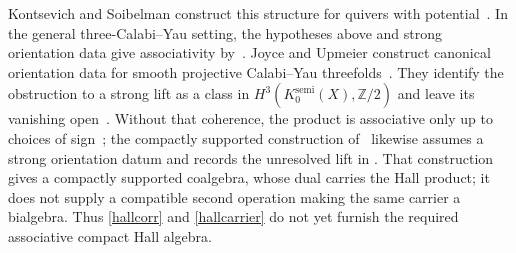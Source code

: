 \documentclass[11pt]{article}
\begin{document}
Kontsevich and Soibelman construct this structure for quivers with
potential~\cite[\S7]{KontsevichSoibelman2011}.  In the general
three-Calabi--Yau setting, the hypotheses above and strong orientation data
give associativity
by~\cite[Theorem A, Definition 8.4, Corollary 8.8]{KinjoParkSafronov2026}.
Joyce and Upmeier construct canonical orientation data for smooth
projective Calabi--Yau threefolds~\cite[Theorem 4.4]{JoyceUpmeier2021}.
They identify the obstruction to a strong lift as a class in
$H^3(K^{\mathrm{semi}}_0(X),\mathbb Z/2)$ and leave its vanishing
open~\cite[Theorem 3.10, Question 3.11]{JoyceUpmeier2021}.
Without that coherence, the product is associative only up to choices of
sign~\cite[Remark 8.7]{KinjoParkSafronov2026}; the compactly supported
construction of~\cite[Theorem 7.22]{Descombes2025} likewise assumes a
strong orientation datum and records the unresolved lift in
\cite[Remark 7.23]{Descombes2025}. That construction gives a compactly
supported coalgebra, whose dual carries the Hall product; it does not
supply a compatible second operation making the same carrier a bialgebra.
Thus
\eqref{hallcorr} and \eqref{hallcarrier} do not yet furnish the required
associative compact Hall algebra.
\end{document}
